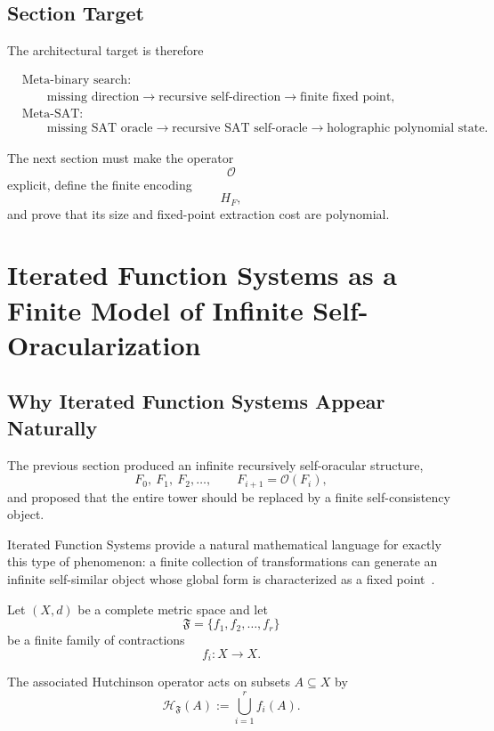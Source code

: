 \documentclass[11pt]{article}
\theoremstyle{plain}
\theoremstyle{definition}
\begin{document}
\subsection{Section Target}

The architectural target is therefore

\[
\boxed{
\begin{aligned}
&\text{Meta-binary search:}\\
&\qquad
\text{missing direction}
\to
\text{recursive self-direction}
\to
\text{finite fixed point},
\\[6pt]
&\text{Meta-SAT:}\\
&\qquad
\text{missing SAT oracle}
\to
\text{recursive SAT self-oracle}
\to
\text{holographic polynomial state}.
\end{aligned}
}
\]

The next section must make the operator
\[
    \mathcal{O}
\]
explicit, define the finite encoding
\[
    H_F,
\]
and prove that its size and fixed-point extraction cost are polynomial.


\section{Iterated Function Systems as a Finite Model of Infinite Self-Oracularization}
\label{sec:ifs-self-oracle}

\subsection{Why Iterated Function Systems Appear Naturally}

The previous section produced an infinite recursively self-oracular structure,
\[
    F_0,\ F_1,\ F_2,\dots,
    \qquad
    F_{i+1}=\mathcal{O}(F_i),
\]
and proposed that the entire tower should be replaced by a finite
self-consistency object.

Iterated Function Systems provide a natural mathematical language for exactly
this type of phenomenon: a finite collection of transformations can generate
an infinite self-similar object whose global form is characterized as a fixed
point~\cite{Hutchinson1981}.

Let \((X,d)\) be a complete metric space and let
\[
    \mathfrak{F}
    =
    \{f_1,f_2,\dots,f_r\}
\]
be a finite family of contractions
\[
    f_i:X\to X.
\]

The associated Hutchinson operator acts on subsets \(A\subseteq X\) by
\[
    \mathcal{H}_{\mathfrak{F}}(A)
    :=
    \bigcup_{i=1}^{r} f_i(A).
\]
\end{document}
